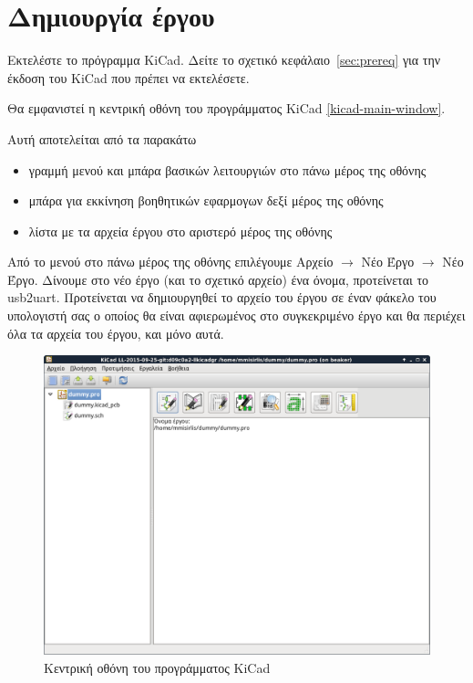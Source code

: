 \documentclass[a4paper]{article}
\begin{document}
\section{Δημιουργία έργου}
Εκτελέστε το πρόγραμμα \textenglish{KiCad}. Δείτε το σχετικό κεφάλαιο~\ref{sec:prereq} για την έκδοση του \textenglish{KiCad} που πρέπει να εκτελέσετε.

Θα εμφανιστεί η κεντρική οθόνη του προγράμματος \textenglish{KiCad} \ref{kicad-main-window}. 

Αυτή αποτελείται από τα παρακάτω
\begin{itemize}
    \item γραμμή μενού και μπάρα βασικών λειτουργιών στο πάνω μέρος της οθόνης
    \item μπάρα για εκκίνηση βοηθητικών εφαρμογων δεξί μέρος της οθόνης
    \item λίστα με τα αρχεία έργου στο αριστερό μέρος της οθόνης
\end{itemize}

Από το μενού στο πάνω μέρος της οθόνης επιλέγουμε Αρχείο $\rightarrow$ Νέο Έργο $\rightarrow$ Νέο Έργο. Δίνουμε στο νέο έργο (και το σχετικό αρχείο) ένα όνομα, προτείνεται το usb2uart. Προτείνεται να δημιουργηθεί το αρχείο του έργου σε έναν φάκελο του υπολογιστή σας ο οποίος θα είναι αφιερωμένος στο συγκεκριμένο έργο και θα περιέχει όλα τα αρχεία του έργου, και μόνο αυτά.

\begin{figure}
  \begin{center}
    \includegraphics[width=.9\textwidth]{img/kicad-main-window}
    \caption{Κεντρική οθόνη του προγράμματος KiCad}
    \label{fig:kicad-main-window}
  \end{center}
\end{figure}
\end{document}

